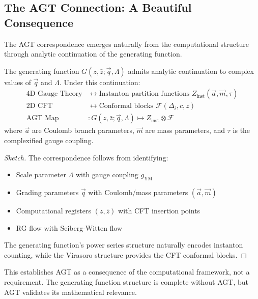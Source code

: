 \subsection{The AGT Connection: A Beautiful Consequence}

The AGT correspondence emerges naturally from the computational structure through analytic continuation of the generating function.

\begin{theorem}
\label{thm:agt-correspondence}
The generating function $G(z, \bar{z}; \vec{q}, \Lambda)$ admits analytic continuation to complex values of $\vec{q}$ and $\Lambda$. Under this continuation:
\begin{align}
\text{4D Gauge Theory} &\leftrightarrow \text{Instanton partition functions } Z_{\text{inst}}(\vec{a}, \vec{m}, \tau) \\
\text{2D CFT} &\leftrightarrow \text{Conformal blocks } \mathcal{F}(\Delta_i, c, z) \\
\text{AGT Map} &: G(z, \bar{z}; \vec{q}, \Lambda) \mapsto Z_{\text{inst}} \otimes \mathcal{F}
\end{align}
where $\vec{a}$ are Coulomb branch parameters, $\vec{m}$ are mass parameters, and $\tau$ is the complexified gauge coupling.
\end{theorem}

\begin{proof}[Sketch]
The correspondence follows from identifying:
\begin{itemize}
\item Scale parameter $\Lambda$ with gauge coupling $g_{\text{YM}}$
\item Grading parameters $\vec{q}$ with Coulomb/mass parameters $(\vec{a}, \vec{m})$
\item Computational registers $(z, \bar{z})$ with CFT insertion points
\item RG flow with Seiberg-Witten flow
\end{itemize}
The generating function's power series structure naturally encodes instanton counting, while the Virasoro structure provides the CFT conformal blocks.
\end{proof}

This establishes AGT as a consequence of the computational framework, not a requirement. The generating function structure is complete without AGT, but AGT validates its mathematical relevance.
